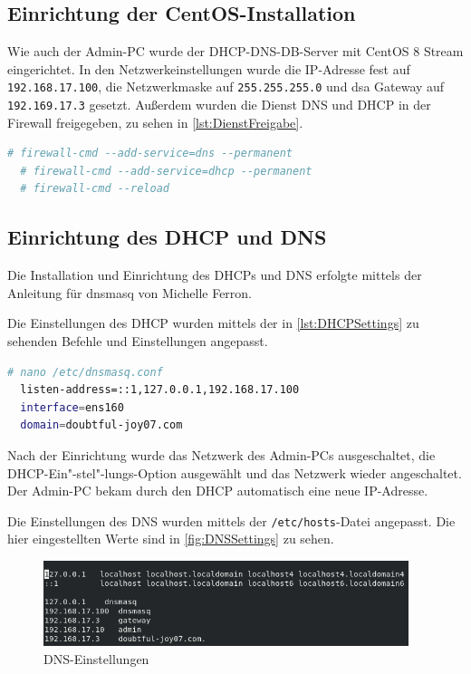 \documentclass[a4paper,
    11pt,
    headings=small,
    ngerman,
    listof=totoc,
    numbers=noenddot]{scrreprt}[2021/11/13]
\begin{document}
\subsection{Einrichtung der CentOS-Installation}

Wie auch der Admin-PC wurde der \ac{DHCP}-\ac{DNS}-\ac{DB}-Server mit CentOS 8 Stream eingerichtet. In den Netzwerkeinstellungen wurde die IP-Adresse fest auf \texttt{192.168.17.100}, die Netzwerkmaske auf \texttt{255.255.255.0} und dsa Gateway auf \texttt{192.169.17.3} gesetzt. Außerdem wurden die Dienst \ac{DNS} und \ac{DHCP} in der Firewall freigegeben, zu sehen in \vref{lst:DienstFreigabe}.

\begin{lstlisting}[language=bash,caption={Dienste-Freigabe einer CentOS-Firewall},label={lst:DienstFreigabe}]
  # firewall-cmd --add-service=dns --permanent
  # firewall-cmd --add-service=dhcp --permanent
  # firewall-cmd --reload
\end{lstlisting}


\subsection{Einrichtung des DHCP und DNS}

Die Installation und Einrichtung des \ac{DHCP}s und \ac{DNS} erfolgte mittels der Anleitung für dnsmasq von Michelle Ferron. \autocite{zextras:DHCPDNS}

Die Einstellungen des \ac{DHCP} wurden mittels der in \vref{lst:DHCPSettings} zu sehenden Befehle und Einstellungen angepasst.

\begin{lstlisting}[language=bash,caption={DHCP-Einstellungen},label={lst:DHCPSettings}]
  # nano /etc/dnsmasq.conf
  listen-address=::1,127.0.0.1,192.168.17.100
  interface=ens160
  domain=doubtful-joy07.com
\end{lstlisting}

Nach der Einrichtung wurde das Netzwerk des Admin-PCs ausgeschaltet, die \ac{DHCP}-Ein"-stel"-lungs-Option ausgewählt und das Netzwerk wieder angeschaltet. Der Admin-PC bekam durch den DHCP automatisch eine neue IP-Adresse.

Die Einstellungen des \ac{DNS} wurden mittels der \texttt{/etc/hosts}-Datei angepasst. Die hier eingestellten Werte sind in \vref{fig:DNSSettings} zu sehen.

\begin{figure}[htbp]
  \centering
  \includegraphics[width=0.95\textwidth]{data/dns-hosts-file.png}
  \caption{DNS-Einstellungen}
  \label{fig:DNSSettings}
\end{figure}
\end{document}
